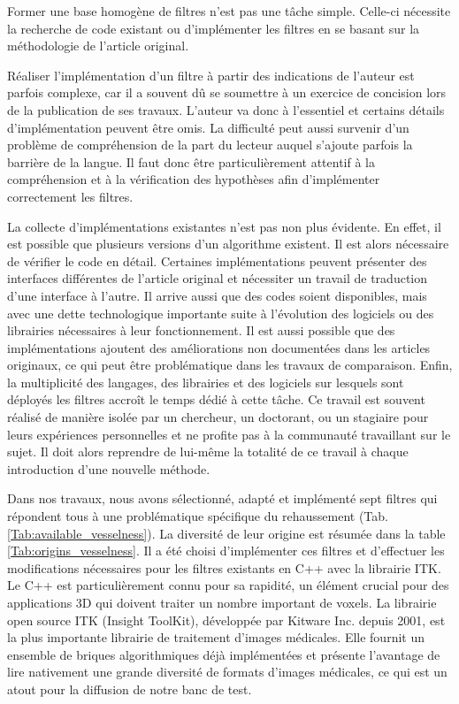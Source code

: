 Former une base homogène de filtres n'est pas une tâche simple. Celle-ci nécessite la recherche de code existant ou d'implémenter les filtres en se basant sur la méthodologie de l'article original.

Réaliser l'implémentation d'un filtre à partir des indications de l'auteur est parfois complexe, car il a souvent dû se soumettre à un exercice de concision lors de la publication de ses travaux. L'auteur va donc à l'essentiel et certains détails d'implémentation peuvent être omis. La difficulté peut aussi survenir d'un problème de compréhension de la part du lecteur auquel s'ajoute parfois la barrière de la langue. Il faut donc être particulièrement attentif à la compréhension et à la vérification des hypothèses afin d'implémenter correctement les filtres. 

La collecte d'implémentations existantes n'est pas non plus évidente. En effet, il est possible que plusieurs versions d'un algorithme existent. Il est alors nécessaire de vérifier le code en détail. Certaines implémentations peuvent présenter des interfaces différentes de l'article original et nécessiter un travail de traduction d'une interface à l'autre. Il arrive aussi que des codes soient disponibles, mais avec une dette technologique importante suite à l'évolution des logiciels ou des librairies nécessaires à leur fonctionnement. Il est aussi possible que des implémentations ajoutent des améliorations non documentées dans les articles originaux, ce qui peut être problématique dans les travaux de comparaison. Enfin, la multiplicité des langages, des librairies et des logiciels sur lesquels sont déployés les filtres accroît le temps dédié à cette tâche. Ce travail est souvent réalisé de manière isolée par un chercheur, un doctorant, ou un stagiaire pour leurs expériences personnelles et ne profite pas à la communauté travaillant sur le sujet. Il doit alors reprendre de lui-même la totalité de ce travail à chaque introduction d'une nouvelle méthode.

Dans nos travaux, nous avons sélectionné, adapté et implémenté sept filtres qui répondent tous à une problématique spécifique du rehaussement (Tab. \ref{Tab:available_vesselness}). La diversité de leur origine est résumée dans la table \ref{Tab:origins_vesselness}. Il a été choisi d'implémenter ces filtres et d'effectuer les modifications nécessaires pour les filtres existants en C++ avec la librairie ITK. Le C++ est particulièrement connu pour sa rapidité, un élément crucial pour des applications 3D qui doivent traiter un nombre important de voxels. La librairie open source ITK (Insight ToolKit), développée par Kitware Inc. depuis 2001, est la plus importante librairie de traitement d'images médicales. Elle fournit un ensemble de briques algorithmiques déjà implémentées et présente l'avantage de lire nativement une grande diversité de formats d'images médicales, ce qui est un atout pour la diffusion de notre banc de test.

